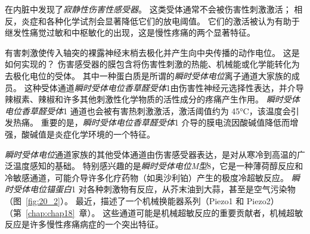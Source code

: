 在内脏中发现了\textit{寂静性伤害性感受器}。
这类受体通常不会被伤害性刺激激活；
相反，炎症和各种化学试剂会显著降低它们的放电阈值。
它们的激活被认为有助于继发性痛觉过敏和中枢敏化的出现，这是慢性疼痛的两个显著特征。


有害刺激使传入轴突的裸露神经末梢去极化并产生向中央传播的动作电位。
这是如何实现的？
伤害感受器的膜包含将伤害性刺激的热能、机械能或化学能转化为去极化电位的受体。
其中一种蛋白质是所谓的\textit{瞬时受体电位}离子通道大家族的成员。
这种受体通道\textit{瞬时受体电位香草醛受体}1由伤害性神经元选择性表达，并介导辣椒素、辣椒和许多其他刺激性化学物质的活性成分的疼痛产生作用。
\textit{瞬时受体电位香草醛受体}1 通道也会被有害热刺激激活，激活阈值约为 45°C，该温度会引发热痛。
重要的是，\textit{瞬时受体电位香草醛受体}1 介导的膜电流因酸碱值降低而增强，酸碱值是炎症化学环境的一个特征。


\textit{瞬时受体电位}通道家族的其他受体通道由伤害感受器表达，是对从寒冷到高温的广泛温度感知的基础。
特别感兴趣的是\textit{瞬时受体电位M型}8，它是一种薄荷醇反应和冷敏感通道，可能介导许多化疗药物（如奥沙利铂）产生的极度冷超敏反应。
\textit{瞬时受体电位锚蛋白}1 对各种刺激物有反应，从芥末油到大蒜，甚至是空气污染物（图~\ref{fig:20_2}）。
最近，描述了一个机械换能器系列（Piezo1 和 Piezo2）（第~\ref{chap:chap18}~章）。
这些通道可能是机械超敏反应的重要贡献者，机械超敏反应是许多慢性疼痛病症的一个突出特征。



